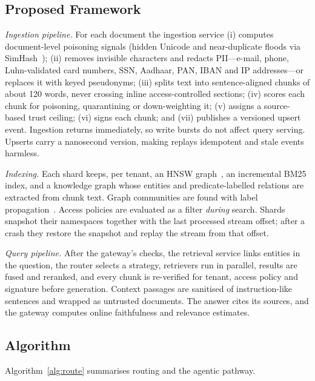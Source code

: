 \documentclass[journal]{IEEEtran}
\begin{document}
\subsection{Proposed Framework}
\textit{Ingestion pipeline.} For each document the ingestion service (i) computes document-level poisoning
signals (hidden Unicode and near-duplicate floods via SimHash~\cite{charikar2002simhash}); (ii) removes
invisible characters and redacts PII---e-mail, phone, Luhn-validated card numbers, SSN, Aadhaar, PAN, IBAN
and IP addresses---or replaces it with keyed pseudonyms; (iii) splits text into sentence-aligned chunks of
about 120 words, never crossing inline access-controlled sections; (iv) scores each chunk for
poisoning, quarantining or down-weighting it; (v) assigns a source-based trust ceiling; (vi) signs each
chunk; and (vii) publishes a versioned upsert event. Ingestion returns immediately, so write bursts do not
affect query serving. Upserts carry a nanosecond version, making replays idempotent and stale events
harmless.

\textit{Indexing.} Each shard keeps, per tenant, an HNSW graph~\cite{malkov2020hnsw}, an incremental BM25
index, and a knowledge graph whose entities and predicate-labelled relations are extracted from chunk
text. Graph communities are found with label propagation~\cite{raghavan2007lpa}. Access policies are
evaluated as a filter \emph{during} search. Shards snapshot their namespaces together with the last
processed stream offset; after a crash they restore the snapshot and replay the stream from that offset.

\textit{Query pipeline.} After the gateway's checks, the retrieval service links entities in the
question, the router selects a strategy, retrievers run in parallel, results are fused and reranked, and
every chunk is re-verified for tenant, access policy and signature before generation. Context passages
are sanitised of instruction-like sentences and wrapped as untrusted documents. The answer cites its
sources, and the gateway computes online faithfulness and relevance estimates.

\subsection{Algorithm}
Algorithm~\ref{alg:route} summarises routing and the agentic pathway.
\end{document}
